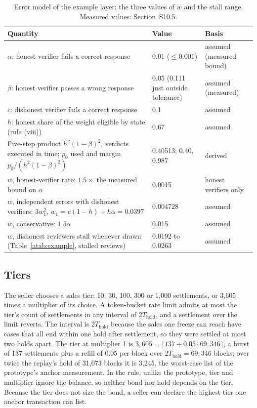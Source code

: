 \documentclass[10pt,a4paper]{article}
\newcommand{\Thold}{T_{\mathrm{hold}}}
\theoremstyle{plain}
\theoremstyle{remark}
\begin{document}
\begin{table}[t]
\centering
\caption{Error model of the example layer: the three values of $w$ and the stall range. Measured values: Section~S10.5.}
\label{atab:error}
\scriptsize
\setlength{\tabcolsep}{3pt}\renewcommand{\arraystretch}{0.9}
\begin{tabular}{@{}>{\raggedright}p{4.75cm}>{\raggedright}p{1.8cm}>{\raggedright\arraybackslash}p{1.88cm}@{}}
\toprule
Quantity & Value & Basis \\
\midrule
$\alpha$: honest verifier fails a correct response & 0.01 ($\le0.001$) & assumed (measured bound) \\
$\beta$: honest verifier passes a wrong response & 0.05 (0.111 just outside tolerance) & assumed (measured) \\
$c$: dishonest verifier fails a correct response & 0.1 & assumed \\
$h$: honest share of the weight eligible by state (rule (viii)) & 0.67 & assumed \\
Five-step product $h^2(1-\beta)^2$, verdicts executed in time; $p_0$ used and margin $p_0/(h^2(1-\beta)^2)$ & 0.40513; 0.40, 0.987 & derived \\
\midrule
$w$, honest-verifier rate: $1.5\times$ the measured bound on $\alpha$ & 0.0015 & honest verifiers only \\
$w$, independent errors with dishonest verifiers: $3w_1^2$, $w_1=c(1-h)+h\alpha=0.0397$ & 0.004728 & assumed \\
$w$, conservative: $1.5\alpha$ & 0.015 & assumed \\
$w$, dishonest reviewers stall whenever drawn (Table~\ref{atab:example}, stalled reviews) & 0.0192 to 0.0263 & assumed \\
\bottomrule
\end{tabular}
\end{table}

\subsection{Tiers}
\label{app:tier}
The seller chooses a sales tier: 10, 30, 100, 300 or 1,000 settlements, or 3,605 times a multiplier of its choice. A token-bucket rate limit admits at most the tier's count of settlements in any interval of $2\Thold$, and a settlement over the limit reverts. The interval is $2\Thold$ because the sales one freeze can reach have cases that all end within one hold after settlement, so they were settled at most two holds apart. The tier at multiplier 1 is $3{,}605=\lceil 137+0.05\cdot 69{,}346\rceil$, a burst of 137 settlements plus a refill of 0.05 per block over $2\Thold=69{,}346$ blocks; over twice the replay's hold of 31,073 blocks it is 3,245, the worst-case list of the prototype's anchor measurement. In the rule, unlike the prototype, tier and multiplier ignore the balance, so neither bond nor hold depends on the tier. Because the tier does not size the bond, a seller can declare the highest tier one anchor transaction can list.
\end{document}
